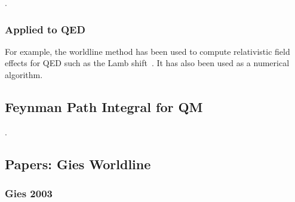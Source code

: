 
\cite{Schubert2001}.  

\subsubsection{Applied to QED}

For example, the worldline method has been used to compute relativistic field effects for QED such
 as the Lamb shift~\cite{Schmidt1995}.  It has also been used as a numerical algorithm\cite{Mazur2014}.

\subsection{Feynman Path Integral for QM}

\cite{Feynman1948,Feynman1965,Brown2005}.

\subsection{Papers: Gies Worldline}

\subsubsection{Gies 2003}
\cite{Gies2003}

